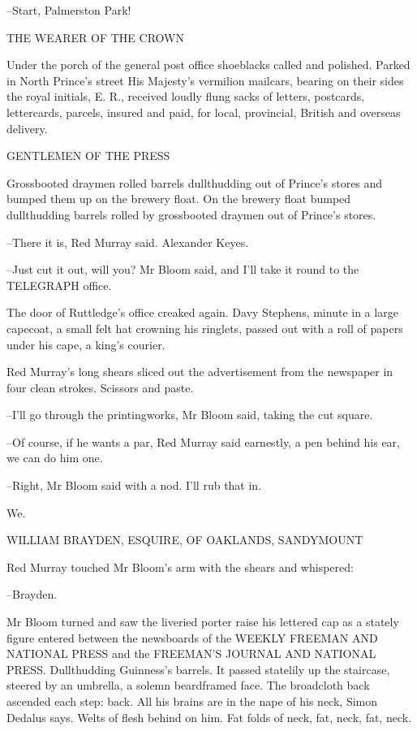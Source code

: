 --Start, Palmerston Park!


    THE WEARER OF THE CROWN


Under the porch of the general post office shoeblacks called and
polished. Parked in North Prince's street His Majesty's vermilion
mailcars, bearing on their sides the royal initials, E. R., received
loudly flung sacks of letters, postcards, lettercards, parcels, insured
and paid, for local, provincial, British and overseas delivery.


    GENTLEMEN OF THE PRESS


Grossbooted draymen rolled barrels dullthudding out of Prince's
stores and bumped them up on the brewery float. On the brewery float
bumped dullthudding barrels rolled by grossbooted draymen out of
Prince's stores.

--There it is, Red Murray said. Alexander Keyes.

--Just cut it out, will you? Mr Bloom said, and I'll take it round to the
TELEGRAPH office.

The door of Ruttledge's office creaked again. Davy Stephens, minute
in a large capecoat, a small felt hat crowning his ringlets, passed out
with a roll of papers under his cape, a king's courier.

Red Murray's long shears sliced out the advertisement from the
newspaper in four clean strokes. Scissors and paste.

--I'll go through the printingworks, Mr Bloom said, taking the cut square.

--Of course, if he wants a par, Red Murray said earnestly, a pen behind
his ear, we can do him one.

--Right, Mr Bloom said with a nod. I'll rub that in.

We.


    WILLIAM BRAYDEN,
    ESQUIRE, OF OAKLANDS, SANDYMOUNT


Red Murray touched Mr Bloom's arm with the shears and whispered:

--Brayden.

Mr Bloom turned and saw the liveried porter raise his lettered cap as a
stately figure entered between the newsboards of the WEEKLY FREEMAN AND
NATIONAL PRESS and the FREEMAN'S JOURNAL AND NATIONAL PRESS. Dullthudding
Guinness's barrels. It passed statelily up the staircase, steered by an
umbrella, a solemn beardframed face. The broadcloth back ascended each
step: back. All his brains are in the nape of his neck, Simon Dedalus
says. Welts of flesh behind on him. Fat folds of neck, fat, neck, fat,
neck.

